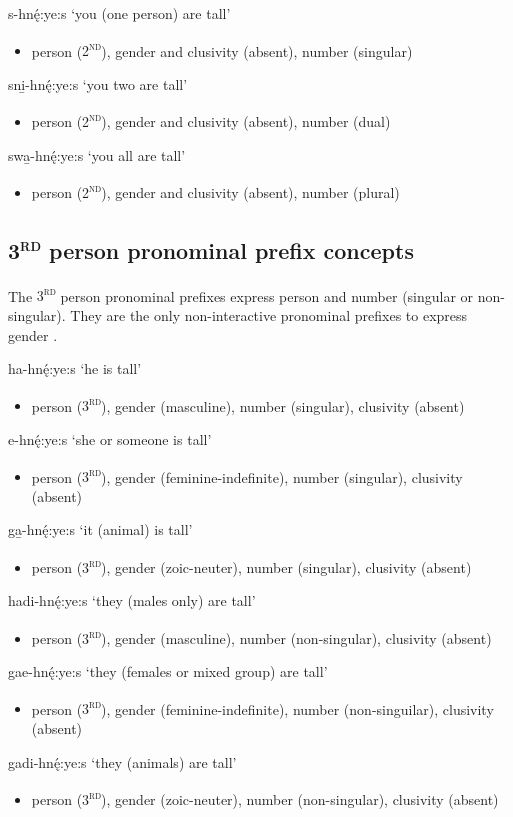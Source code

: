 \ea\label{ex:2ndex100}
\ea s-hnę́:ye:s ‘you (one person) are tall’
\begin{itemize}
    \item person (\textsc{2\textsuperscript{nd}}), gender and clusivity (absent), number (singular)
\end{itemize} 
\ex sni̱-hnę́:ye:s ‘you two are tall’
\begin{itemize}
    \item person (\textsc{2\textsuperscript{nd}}), gender and clusivity (absent), number (dual)
\end{itemize} 
\ex swa̱-hnę́:ye:s ‘you all are tall’
\begin{itemize}
    \item person (\textsc{2\textsuperscript{nd}}), gender and clusivity (absent), number (plural)
\end{itemize}
\z
\z

\subsection{\textsc{3\textsuperscript{rd}} person pronominal prefix concepts} \label{3rd person pronominal prefix concepts}
The \textsc{3\textsuperscript{rd}} person pronominal prefixes express person and number (singular or non-singular). They are the only non-interactive pronominal prefixes to express gender .

\ea\label{ex:3rdex100}
\ea ha-hnę́:ye:s ‘he is tall’
\begin{itemize}
    \item person (\textsc{3\textsuperscript{rd}}), gender (masculine), number (singular), clusivity (absent)
\end{itemize}
\ex e-hnę́:ye:s ‘she or someone is tall’
\begin{itemize}
    \item person (\textsc{3\textsuperscript{rd}}), gender (feminine-indefinite), number (singular), clusivity (absent)
\end{itemize}
\ex ga̱-hnę́:ye:s ‘it (animal) is tall’
\begin{itemize}
    \item person (\textsc{3\textsuperscript{rd}}), gender (zoic-neuter), number (singular), clusivity (absent)
\end{itemize}
\ex hadi-hnę́:ye:s ‘they (males only) are tall’
\begin{itemize}
    \item person (\textsc{3\textsuperscript{rd}}), gender (masculine), number (non-singular), clusivity (absent)
\end{itemize}
\ex gae-hnę́:ye:s ‘they (females or mixed group) are tall’ 
\begin{itemize}
    \item person (\textsc{3\textsuperscript{rd}}), gender (feminine-indefinite), number (non-singuilar), clusivity (absent)
\end{itemize}
\ex gadi-hnę́:ye:s ‘they (animals) are tall’
\begin{itemize}
    \item person (\textsc{3\textsuperscript{rd}}), gender (zoic-neuter), number (non-singular), clusivity (absent)
\end{itemize}
\z
\z

